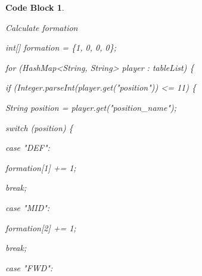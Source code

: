 \documentclass[12pt, a4paper, oneside]{book}
\newtheorem{codeblock}[theorem]{Code Block}
\numberwithin{equation}{section}
\begin{document}
\begin{codeblock} \label{Calculate formation}

  Calculate formation

  int[] formation = \{1, 0, 0, 0\};
  
  for (HashMap<String, String> player : tableList) \{
  
  \hspace{\parindent}if (Integer.parseInt(player.get("position")) <= 11) \{
  
  \hspace{\parindent}\hspace{\parindent}String position = player.get("position\_name");
  
  \hspace{\parindent}\hspace{\parindent}switch (position) \{
  
  \hspace{\parindent}\hspace{\parindent}\hspace{\parindent}case "DEF":

  \hspace{\parindent}\hspace{\parindent}\hspace{\parindent}\hspace{\parindent}formation[1] += 1;

  \hspace{\parindent}\hspace{\parindent}\hspace{\parindent}\hspace{\parindent}break;

  \hspace{\parindent}\hspace{\parindent}\hspace{\parindent}case "MID":

  \hspace{\parindent}\hspace{\parindent}\hspace{\parindent}\hspace{\parindent}formation[2] += 1;

  \hspace{\parindent}\hspace{\parindent}\hspace{\parindent}\hspace{\parindent}break;
  
  \hspace{\parindent}\hspace{\parindent}\hspace{\parindent}case "FWD":


\end{codeblock}
\end{document}
